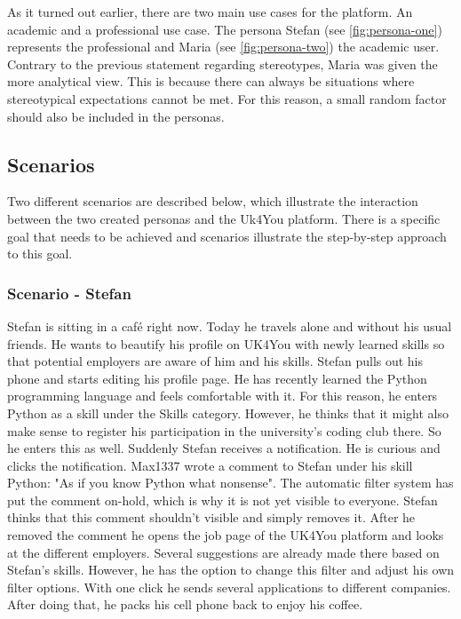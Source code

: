 As it turned out earlier, there are two main use cases for the platform.
An academic and a professional use case.
The persona Stefan (see \autoref{fig:persona-one}) represents the professional and Maria (see \autoref{fig:persona-two}) the academic user.
Contrary to the previous statement regarding stereotypes, Maria was given the more analytical view.
This is because there can always be situations where stereotypical expectations cannot be met.
For this reason, a small random factor should also be included in the personas.

\subsection{Scenarios}
Two different scenarios are described below, which illustrate the interaction between the two created personas and the Uk4You platform.
There is a specific goal that needs to be achieved and scenarios illustrate the step-by-step approach to this goal.

\subsubsection{Scenario - Stefan}
Stefan is sitting in a café right now.
Today he travels alone and without his usual friends.
He wants to beautify his profile on UK4You with newly learned skills so that potential employers are aware of him and his skills.
Stefan pulls out his phone and starts editing his profile page.
He has recently learned the Python programming language and feels comfortable with it.
For this reason, he enters Python as a skill under the Skills category.
However, he thinks that it might also make sense to register his participation in the university's coding club there.
So he enters this as well.
Suddenly Stefan receives a notification.
He is curious and clicks the notification.
Max1337 wrote a comment to Stefan under his skill Python: "As if you know Python what nonsense".
The automatic filter system has put the comment on-hold, which is why it is not yet visible to everyone.
Stefan thinks that this comment shouldn't visible and simply removes it.
After he removed the comment he opens the job page of the UK4You platform and looks at the different employers.
Several suggestions are already made there based on Stefan's skills.
However, he has the option to change this filter and adjust his own filter options.
With one click he sends several applications to different companies.
After doing that, he packs his cell phone back to enjoy his coffee.

